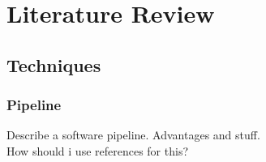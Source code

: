 
\chapter{Literature Review}




\section{Techniques}

\subsection{Pipeline} \label{pipeline}
Describe a software pipeline. Advantages and stuff.\\
How should i use references for this?


\cleardoublepage